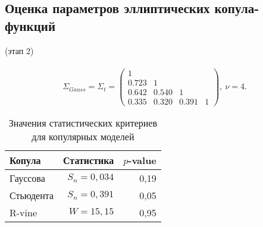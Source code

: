 \documentclass[aspectratio=169]{beamer}
\begin{document}

\subsection{Оценка параметров эллиптических копула-функций}

\begin{frame}{{\insertsection} (этап 2)}
    \framesubtitle{\insertsubsection}
    \begin{equation} \label{tcopfit}
       \Sigma_{Gauss} = \Sigma_t = \left(
        \begin{array}{cccc}
            1 & & & \\
            0.723 & 1 & & \\
            0.642 & 0.540 & 1 & \\
            0.335 & 0.320 & 0.391 & 1
        \end{array} \right), \ \nu = 4.
    \end{equation}
    \begin{table}
    \centering
    \caption{Значения статистических критериев для копулярных моделей}
    \label{tab:coptest}
    \setlength{\tabcolsep}{8pt}
    \begin{tabular}{lrr}
    \toprule
    Копула & Статистика & $p$-value \\ \midrule
    Гауссова  & $S_n=0,034$ & 0,19 \\
    Стьюдента & $S_n=0,391$ & 0,05 \\
    R-vine    & $W=15,15$   & 0,95    \\ \bottomrule
    \end{tabular}
    \end{table}
\end{frame}
\end{document}
